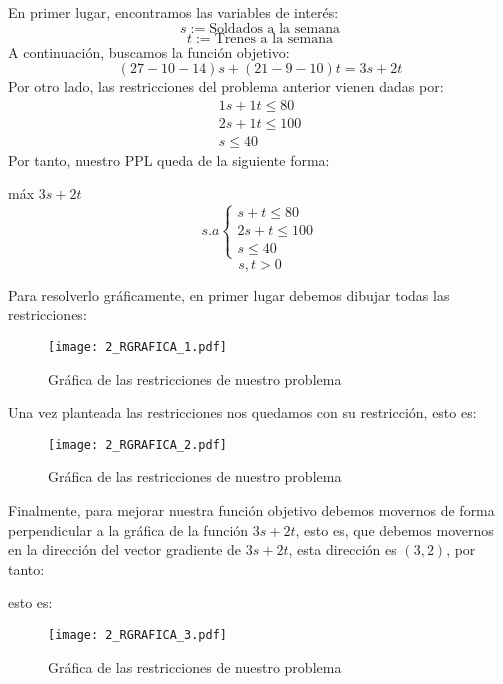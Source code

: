 \begin{solucion}
  En primer lugar, encontramos las variables de interés:
  $$s:=\text{Soldados a la semana}$$
  $$t:=\text{Trenes a la semana}$$
  A continuación, buscamos la función objetivo:
  $$(27-10-14)s+(21-9-10)t=3s+2t$$
  Por otro lado, las restricciones del problema anterior vienen dadas
  por:
  $$
  \begin{array}{l}
    1s+1t \leq 80 \\
    2s+1t \leq 100 \\
    s \leq 40
  \end{array}
  $$
  Por tanto, nuestro PPL queda de la siguiente forma:
  \begin{center}
    máx $3s+2t$
    $$s.a\left\lbrace
      \begin{array}{l}
	s+t \leq 80 \\
	2s+t \leq 100 \\
	s \leq 40
      \end{array}
    \right.
    $$
    $$s, t>0$$
  \end{center}
  Para resolverlo gráficamente, en primer lugar debemos dibujar todas
  las restricciones:
  \begin{figure}[H]
    \centering
    \texttt{[image: 2\_RGRAFICA\_1.pdf]}
    \caption[Gráfica de las restricciones de nuestro problema]{Gráfica de las restricciones de nuestro problema}
  \end{figure}

  Una vez planteada las restricciones nos quedamos con su restricción,
  esto es:
  \begin{figure}[H]
    \centering
    \texttt{[image: 2\_RGRAFICA\_2.pdf]}
    \caption[Gráfica de las restricciones de nuestro problema]{Gráfica de las restricciones de nuestro problema}
  \end{figure}

  Finalmente, para mejorar nuestra función objetivo debemos movernos
  de forma perpendicular a la gráfica de la función $3s+2t$, esto es,
  que debemos movernos en la dirección del vector gradiente de
  $3s+2t$, esta dirección es $(3, 2)$, por tanto:

  esto es:
  \begin{figure}[H]
    \centering
    \texttt{[image: 2\_RGRAFICA\_3.pdf]}
    \caption[Gráfica de las restricciones de nuestro problema]{Gráfica de las restricciones de nuestro problema}
  \end{figure}
\end{solucion}

